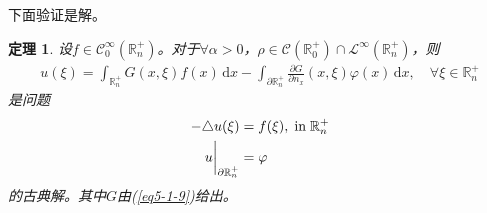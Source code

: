 \documentclass[11pt, a4paper]{article}
\theoremstyle{theorem}
\newtheorem{thm}{定理}[section]
\newcommand{\intd}[1]{\,\mathrm{d}{#1}}
\begin{document}
下面验证是解。

\begin{thm}
    设$f \in \mathcal{C}_0^\infty(\mathbb{R}_n^+)$。对于$\forall \alpha > 0$，$\rho \in \mathcal{C}(\mathbb{R}_0^+) \cap \mathcal{L}^\infty(\mathbb{R}_n^+)$，则
    \begin{align}
        u(\xi) = \int_{\mathbb{R}_n^+} G(x,\xi) f(x) \intd x - \int_{\partial \mathbb{R}_n^+} \frac{\partial G}{\partial n_x} (x,\xi) \varphi(x) \intd x, \quad \forall \xi \in \mathbb{R}_n^+
    \end{align}
    是问题
    \begin{align}
        - \triangle u(\xi) &= f(\xi), \; \text{in} \; \mathbb{R}_n^+ \notag \\
        u \bigg|_{\partial \mathbb{R}_n^+} &= \varphi
    \end{align}
    的古典解。其中$G$由(\ref{eq5-1-9})给出。
\end{thm}
\end{document}
